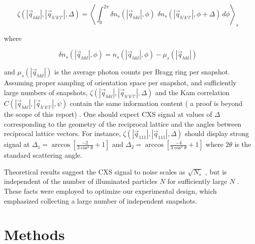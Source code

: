 \documentclass [11pt,fleqn]{article}
\def \be {\begin{equation}}
\def \ee {\end{equation}}
\begin{document}
\be \label{angular}
\zeta (|\vec{q}_{hkl}|,|\vec{q}_{h'k'l'}|, \Delta  ) = \left \langle \int_{0}^{2\pi} \delta n_{s} (| \vec{q}_{hkl}|,\phi ) \,\, \delta n_{s} (|\vec{q}_{h'k'l'}|,\phi + \Delta )\, d\phi  \right \rangle_{s}
\ee

where

\[
\delta n_s( | \vec{q}_{hkl} | , \phi) = n_s( |\vec{q}_{hkl}|,\phi) - \mu_s( |\vec{q}_{hkl}|) 
\]

 and $\mu_s( |\vec{q}_{hkl}|)$ is the average photon counts per Bragg ring per snapshot. Assuming proper sampling of orientation space per snapshot, and sufficiently large numbers of snapshots, $\zeta (|\vec{q}_{hkl}|,|\vec{q}_{h'k'l'}|, \Delta  )$ and the Kam correlation $C (|\vec{q}_{hkl}|,|\vec{q}_{h'k'l'}|, \psi  )$ contain the same information content ( a proof is beyond the scope of this report) . One should expect CXS signal at values of $\Delta $ corresponding to the geometry of the reciprocal lattice and the angles between reciprocal lattice vectors. For instance, $\zeta (|\vec{q}_{111}|,|\vec{q}_{111}|, \Delta  )$ should display strong signal at $\Delta_1 = \arccos[ \frac{-2}{3\cos^{2}\theta} + 1  ]$ and $\Delta_2 = \arccos[ \frac{-4}{3\cos^{2}\theta} + 1  ]$ where $2\theta$ is the standard scattering angle.

Theoretical results suggest the CXS signal to noise scales as $\sqrt{N_{s}}$ , but is independent of the number of illuminated particles $N$ for sufficiently large $N$ \cite{Kam:1977wc, Kam:1981ua, Kirian:2011bq}. These facts were employed to optimize our experimental design, which emphasized collecting a large number of independent snapshots.

\section{Methods}
\end{document}
